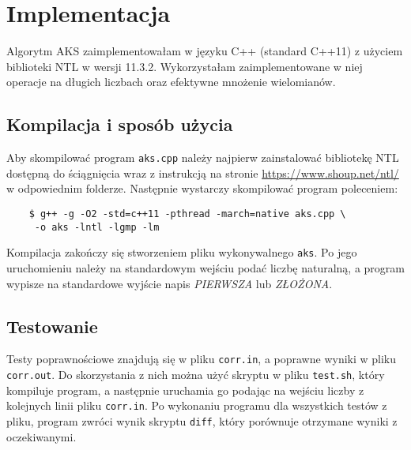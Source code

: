 \documentclass[declaration,shortabstract]{iithesis}
\theoremstyle{definition}
\theoremstyle{remark} \newtheorem{observation}{Obserwacja}
\theoremstyle{plain} \newtheorem{theorem}{Twierdzenie}
\theoremstyle{plain} \newtheorem{lemma}{Lemat}
\theoremstyle{remark} \newtheorem*{remark*}{Uwaga}
\theoremstyle{reminder} \newtheorem*{reminder*}{Przypomnienie}
\begin{document}
\chapter{Implementacja}
    
Algorytm AKS zaimplementowałam w języku C++ (standard C++11) z użyciem biblioteki NTL w wersji 11.3.2. Wykorzystałam zaimplementowane w niej operacje na długich liczbach oraz efektywne mnożenie wielomianów.

\section{Kompilacja i sposób użycia}

Aby skompilować program \verb|aks.cpp| należy najpierw zainstalować bibliotekę NTL dostępną do ściągnięcia wraz z instrukcją na stronie \url{https://www.shoup.net/ntl/} w odpowiednim folderze.
Następnie wystarczy skompilować program poleceniem:
\begin{verbatim}
    $ g++ -g -O2 -std=c++11 -pthread -march=native aks.cpp \
     -o aks -lntl -lgmp -lm
\end{verbatim}

Kompilacja zakończy się stworzeniem pliku wykonywalnego \verb|aks|. Po jego uruchomieniu należy na standardowym wejściu podać liczbę naturalną, a program wypisze na standardowe wyjście napis \textit{PIERWSZA} lub \textit{ZŁOŻONA}. 

\section{Testowanie}

Testy poprawnościowe znajdują się w pliku \verb|corr.in|, a poprawne wyniki w pliku \verb|corr.out|. Do skorzystania z nich można użyć skryptu w pliku \verb|test.sh|, który kompiluje program, a następnie uruchamia go podając na wejściu liczby z kolejnych linii pliku \verb|corr.in|. Po wykonaniu programu dla wszystkich testów z pliku, program zwróci wynik skryptu \verb|diff|, który porównuje otrzymane wyniki z oczekiwanymi.


% 

% 
\printbibliography[heading=bibintoc]

 

\end{document}
